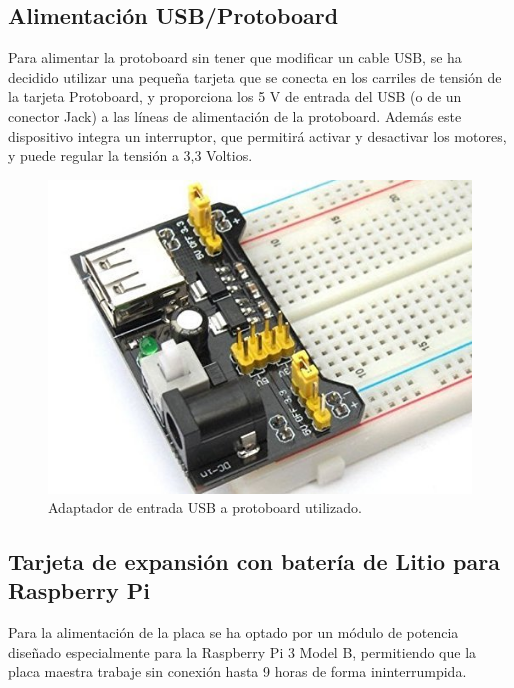 \subsection{ Alimentación USB/Protoboard }

Para alimentar la protoboard sin tener que modificar un cable USB, se ha decidido utilizar una pequeña tarjeta que se conecta en los carriles de tensión de la tarjeta Protoboard, y
proporciona los 5 V de entrada del USB (o de un conector Jack) a las líneas de alimentación de la protoboard. Además este dispositivo integra un interruptor, que permitirá activar y
desactivar los motores, y puede regular la tensión a 3,3 Voltios.\\

\begin{figure}[H]
  \begin{center}
    \includegraphics[scale=0.3]{imagenes/alimentador_usb_protoboard.jpg}
  \end{center}
  \caption{Adaptador de entrada USB a protoboard utilizado.}
  \label{figura:alimentador_placa_usb_protoboard}
\end{figure}


\subsection{ Tarjeta de expansión con batería de Litio para Raspberry Pi }
\label{componente:bateria-expansion}

Para la alimentación de la placa se ha optado por un módulo de potencia diseñado especialmente para la Raspberry Pi 3 Model B, permitiendo que la placa maestra trabaje sin conexión hasta 9 horas
de forma ininterrumpida.\\

